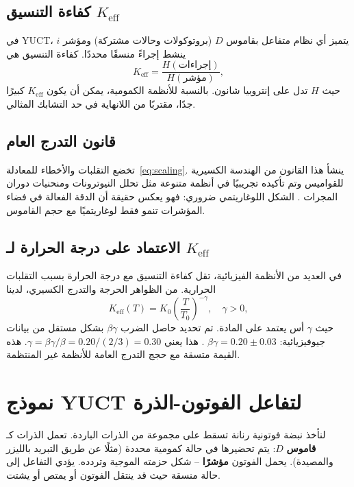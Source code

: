 \documentclass[12pt,a4paper]{article}
\newcommand{\Keff}{K_{\mathrm{eff}}}
\newcommand{\betagamma}{\beta\gamma}
\newcommand{\betac}{\beta}
\begin{document}
	\subsection{كفاءة التنسيق \(\Keff\)}
	
	في YUCT، يتميز أي نظام متفاعل بقاموس \(D\) (بروتوكولات وحالات مشتركة) ومؤشر \(i\) ينشط إجراءً منسقًا محددًا. كفاءة التنسيق هي
	\begin{equation}
		\Keff = \frac{H(\text{إجراءات})}{H(\text{مؤشر})},
	\end{equation}
	حيث \(H\) تدل على إنتروبيا شانون. بالنسبة للأنظمة الكمومية، يمكن أن يكون \(\Keff\) كبيرًا جدًا، مقتربًا من اللانهاية في حد التشابك المثالي.
	
	\subsection{قانون التدرج العام}
	
	تخضع التقلبات والأخطاء للمعادلة~\eqref{eq:scaling}. ينشأ هذا القانون من الهندسة الكسيرية للقواميس وتم تأكيده تجريبيًا في أنظمة متنوعة مثل تحلل النيوترونات ومنحنيات دوران المجرات \cite{Yakushev2026c}. الشكل اللوغاريتمي ضروري: فهو يعكس حقيقة أن الدقة الفعالة في فضاء المؤشرات تنمو فقط لوغاريتميًا مع حجم القاموس.
	
	\subsection{الاعتماد على درجة الحرارة لـ \(\Keff\)}
	
	في العديد من الأنظمة الفيزيائية، تقل كفاءة التنسيق مع درجة الحرارة بسبب التقلبات الحرارية. من الظواهر الحرجة والتدرج الكسيري، لدينا
	\begin{equation}
		\Keff(T) = K_0 \left(\frac{T}{T_0}\right)^{-\gamma}, \quad \gamma > 0,
		\label{eq:K_T}
	\end{equation}
	حيث \(\gamma\) أس يعتمد على المادة. تم تحديد حاصل الضرب \(\betac\gamma\) بشكل مستقل من بيانات جيوفيزيائية: \(\betagamma = 0.20 \pm 0.03\) \cite{Yakushev2026b}. هذا يعني \(\gamma = \betagamma / \betac = 0.20 / (2/3) = 0.30\). هذه القيمة متسقة مع حجج التدرج العامة للأنظمة غير المنتظمة.
	
	\section{نموذج YUCT لتفاعل الفوتون-الذرة}
	
	لنأخذ نبضة فوتونية رنانة تسقط على مجموعة من الذرات الباردة. تعمل الذرات كـ \textbf{قاموس} \(D\): يتم تحضيرها في حالة كمومية محددة (مثلًا عن طريق التبريد بالليزر والمصيدة). يحمل الفوتون \textbf{مؤشرًا} – شكل حزمته الموجية وتردده. يؤدي التفاعل إلى حالة منسقة حيث قد ينتقل الفوتون أو يمتص أو يشتت.
	
\end{document}

